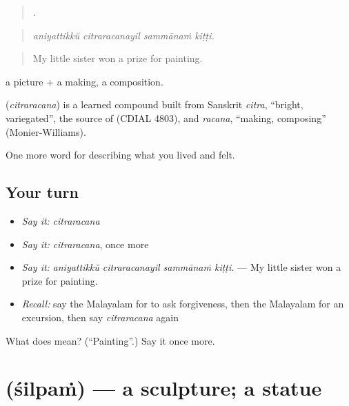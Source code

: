 \begin{quote}
   .
\end{quote}

\begin{quote}
\emph{aniyattikkŭ citraracanayil sammānaṁ kiṭṭi.}
\end{quote}

\begin{quote}
My little sister won a prize for painting.
\end{quote}

 a picture +  a making, a composition.

\begin{cousinweb}
\textbf{} (\emph{citraracana}) is a learned compound built from Sanskrit \emph{citra}, \textquotedblleft{}bright, variegated\textquotedblright{}, the source of  (CDIAL 4803), and \emph{racana}, \textquotedblleft{}making, composing\textquotedblright{} (Monier-Williams).
\end{cousinweb}

\begin{grammarlens}[title={What you've built}]
One more word for describing what you lived and felt.
\end{grammarlens}

\subsection*{Your turn}
\begin{itemize}
\raggedright
  \item \emph{Say it:} \emph{citraracana}
  \item \emph{Say it:} \emph{citraracana}, once more
  \item \emph{Say it:} \emph{aniyattikkŭ citraracanayil sammānaṁ kiṭṭi.} — My little sister won a prize for painting.
  \item \emph{Recall:} say the Malayalam for to ask forgiveness, then the Malayalam for an excursion, then say \emph{citraracana} again
\end{itemize}

\begin{tcolorbox}[breakable,colback=teal!4,colframe=teal!35!black,title={Before you move on}]
What does  mean? (\textquotedblleft{}Painting\textquotedblright{}.) Say it once more.
\end{tcolorbox}
\section[\texorpdfstring{\ml{ശില്പം} (śilpaṁ)}{ശില്പം (śilpaṁ)}]{ (śilpaṁ) — a sculpture; a statue}

